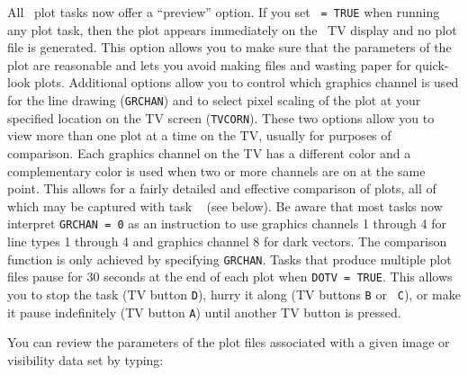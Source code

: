      All \AIPS\ plot tasks now offer a ``preview'' option.  If you set
{\tt {} = TRUE} when running any plot task, then the plot
appears immediately on the \AIPS\ TV display and no plot file is
generated. This option allows you to make sure that the parameters of
the plot are reasonable and lets you avoid making files and wasting
paper for quick-look plots.  Additional options allow you to control
which graphics channel is used for the line drawing ({\tt GRCHAN}) and
to select pixel scaling of the plot at your specified location on the
TV screen ({\tt TVCORN})\@.  These two options allow you to view
more than one plot at a time on the TV, usually for purposes of
comparison.  Each graphics channel on the TV has a different color and
a complementary color is used when two or more channels are on at the
same point.  This allows for a fairly detailed and effective
comparison of plots, all of which may be captured with task {\tt
{}} (see below).  Be aware that most tasks now interpret
{\tt GRCHAN = 0} as an instruction to use graphics channels 1 through
4 for line types 1 through 4 and graphics channel 8 for dark vectors.
The comparison function is only achieved by specifying {\tt GRCHAN}\@.
Tasks that produce multiple plot files pause for 30 seconds at the end
of each plot when {\tt DOTV = TRUE}\@.  This allows you to stop the
task (TV button {\tt D}), hurry it along (TV buttons {\tt B} or {\tt
C}), or make it pause indefinitely (TV button {\tt A}) until another
TV button is pressed.

     You can review the parameters of the plot files associated with a
given image or visibility data set by typing:

